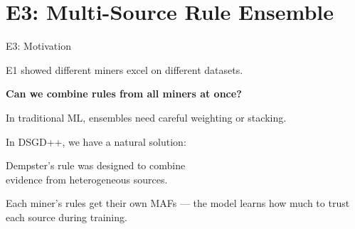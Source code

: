 \documentclass[aspectratio=169,12pt]{beamer}
\begin{document}
\section{E3: Multi-Source Rule Ensemble}

\begin{frame}{E3: Motivation}

E1 showed different miners excel on different datasets.

\vspace{1em}
\textbf{Can we combine rules from all miners at once?}

\vspace{1.5em}
In traditional ML, ensembles need careful weighting or stacking.

\vspace{0.5em}
In DSGD++, we have a natural solution:

\vspace{1em}
\begin{center}
\large
\textcolor{dstblue}{Dempster's rule was designed to combine\\
evidence from heterogeneous sources.}
\end{center}

\vspace{1em}
Each miner's rules get their own MAFs --- the model learns
how much to trust each source during training.

\end{frame}
\end{document}
